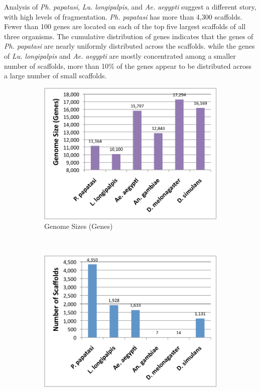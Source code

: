 Analysis of \emph{Ph. papatasi}, \emph{Lu. longipalpis}, and \emph{Ae. aegypti} suggest a different story, with high levels of fragmentation.  \emph{Ph. papatasi} has more than 4,300 scaffolds.  Fewer than 100 genes are located on each of the top five largest scaffolds of all three organisms.  The cumulative distribution of genes indicates that the genes of \emph{Ph. papatasi} are nearly uniformly distributed across the scaffolds.  while the genes of \emph{Lu. longipalpis} and \emph{Ae. aegypti} are mostly concentrated among a smaller number of scaffolds, more than 10\% of the genes appear to be distributed across a large number of small scaffolds.

\begin{figure}[H]
  \centering
  \begin{subfigure}[b]{0.45\textwidth}
    \includegraphics[width=\textwidth]{figures/synteny/genome_size_genes.pdf}
    \caption{Genome Sizes (Genes)}
  \end{subfigure}
  ~
  \begin{subfigure}[b]{0.45\textwidth}
    \includegraphics[width=\textwidth]{figures/synteny/scaffold_counts.pdf}

\end{subfigure}
\end{figure}
